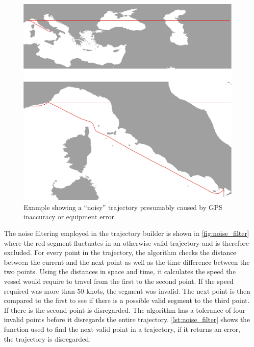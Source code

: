 \begin{figure}[htbp]  %
    \centering
    \includegraphics[width=1.0\textwidth]{figures/noisy_trajectory}
    \caption{Example showing a ``noisy'' trajectory presumably caused by GPS inaccuracy or equipment error}
    \label{fig:noisy_trajectory}
\end{figure}

The noise filtering employed in the trajectory builder is shown in \cref{fig:noise_filter} where the red segment fluctuates in an otherwise valid trajectory and is therefore excluded. For every point in the trajectory, the algorithm checks the distance between the current and the next point as well as the time difference between the two points. Using the distances in space and time, it calculates the speed the vessel would require to travel from the first to the second point. If the speed required was more than 50 knots, the segment was invalid. The next point is then compared to the first to see if there is a possible valid segment to the third point. If there is the second point is disregarded. The algorithm has a tolerance of four invalid points before it disregards the entire trajectory. \cref{lst:noise_filter} shows the function used to find the next valid point in a trajectory, if it returns an error, the trajectory is disregarded.

